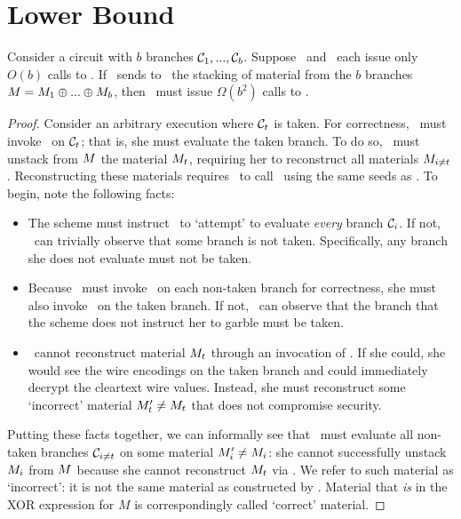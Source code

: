 \section{Lower Bound}\label{sec:lowerbound}
\begin{theorem}
Consider a circuit with $b$ branches $\mathcal C_1,..., \mathcal C_b$.  Suppose
\Eval\ and \Gen\ each issue only
$O(b)$ calls to \Gb. If \Gen\ sends to \Eval\ the stacking of material from
the $b$ branches $M = M_1 \oplus ... \oplus M_b$, then \Gen\ must issue $\Omega(b^2)$  calls to \Ev.
\end{theorem}
\begin{proof}
Consider an arbitrary execution where $\mathcal C_t$  is taken.
For correctness, \Eval\ must invoke \Ev\ on $\mathcal C_t$; that is, she
must evaluate the taken branch.
To do so, \Eval\ must unstack from $M$ the material $M_t$,
requiring her to reconstruct all materials $M_{i\neq t}$.
Reconstructing these materials requires \Eval\ to call \Gb\ using the
same seeds as \Gen.
%
To begin, note the following facts:
\begin{itemize}
  \item
    The scheme must instruct \Eval\ to `attempt' to
    evaluate \emph{every} branch $\mathcal C_i$. If not,
    \Eval\ can trivially observe that some branch is not taken.
    Specifically, any branch she does not evaluate must not be
    taken.
  \item
    Because \Eval\ must invoke \Gb\ on each non-taken branch for
    correctness, she must also invoke \Gb\ on the taken branch.
    If not, \Eval\ can observe that the branch that the
    scheme does not instruct her to garble must be taken.
  \item
    \Eval\ cannot reconstruct material $M_t$
    through an invocation of \Gb. If she could, she would
    see the wire encodings on the taken branch and could immediately
    decrypt the cleartext wire values.
    Instead, she must reconstruct some `incorrect' material $M_t'
    \neq M_t$ that does not compromise security.
\end{itemize}
Putting these facts together, we can informally see that
\Eval\ must evaluate all non-taken branches $\mathcal C_{i\neq t}$ on some
material $M_i' \neq M_i$: she cannot successfully unstack $M_i$
from $M$ because she cannot reconstruct $M_t$ via \Gb.
%
We refer to such material as `incorrect': it is not the same material
as constructed by \Gen.
Material that \emph{is} in the XOR expression for $M$ is correspondingly called
`correct' material.


\end{proof}
